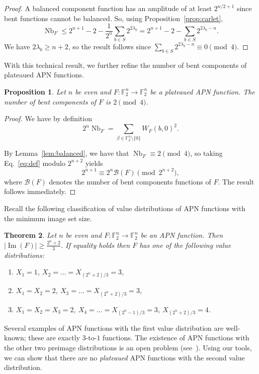 \documentclass[11pt]{article}
\newcommand{\F}{\mathbb F}
\DeclareMathOperator{\Nb}{Nb}
\theoremstyle{plain}
\newtheorem{theorem}{Theorem}[section]
\newtheorem{proposition}[theorem]{Proposition}
\theoremstyle{definition}
\numberwithin{theorem}{section}
\numberwithin{equation}{section}
\numberwithin{table}{section}
\numberwithin{figure}{section}
\DeclareMathOperator{\image}{Im}
\begin{document}
{\begin{proof}
     A balanced component function has an amplitude of at least $2^{n/2+1}$ since bent functions cannot be balanced. So, using Proposition~\ref{prop:carlet},
    $$\Nb_F \leq 2^{n+1}-2-\frac{1}{2^n}\sum_{b \in S}2^{2\lambda_b}=2^{n+1}-2-\sum_{b \in S}2^{2\lambda_b-n}.$$
    We have $2\lambda_b\geq n+2$, so the result follows since $\sum_{b \in S}2^{2\lambda_b-n} \equiv 0 \pmod 4$.
\end{proof}
With this technical result, we further refine the number of bent components of plateaued APN functions.
\begin{proposition}
      Let $n$ be even and $F \colon \F_2^n \rightarrow \F_2^n$ be a plateaued APN function. The number of bent components of $F$ is $2 \pmod 4$.
\end{proposition}
\begin{proof}
    We have by definition
    \begin{equation}
    \label{eq:def}
        2^n\Nb_F = \sum_{\beta \in \F_2^n\setminus \{0\}} W_F(b,0)^2.
    \end{equation}
    
    By Lemma~\ref{lem:balanced}, we have that $\Nb_F \equiv 2 \pmod 4$, so taking Eq.~\eqref{eq:def} modulo $2^{n+2}$ yields
    \[2^{n+1} \equiv 2^n\mathcal{B}(F) \pmod{2^{n+2}},\]
    where $\mathcal{B}(F)$ denotes the number of bent components functions of $F$. The result follows immediately.
\end{proof}
Recall the following classification of value distributions of APN functions with the minimum image set size.
\begin{theorem}{\cite[Theorem 3]{Koelsch2023}} \label{thm:KKK}
     Let $n$ be even and $F \colon \F_2^n \rightarrow \F_2^n$ be an APN function. Then $|\image(F)| \geq \frac{2^n+2}{3}$. If equality holds then $F$ has one of the following value distributions:
     \begin{enumerate}
         \item $X_1=1$, $X_2=\dots=X_{(2^n+2)/3}=3$,
         \item $X_1=X_2=2$, $X_3=\dots=X_{(2^n+2)/3}=3$,
         \item $X_1=X_2=X_3=2$, $X_4=\dots=X_{(2^n-1)/3}=3$, $X_{(2^n+2)/3}=4$.
     \end{enumerate}
\end{theorem}
Several examples of APN functions with the first value distribution are well-known; these are exactly $3$-to-$1$ functions. The existence of APN functions with the other two preimage distributions is an open problem (see~\cite[Open problem 1]{Koelsch2023}). Using our tools, we can show that there are no \emph{plateaued} APN functions with the second value distribution.

}
\end{document}
